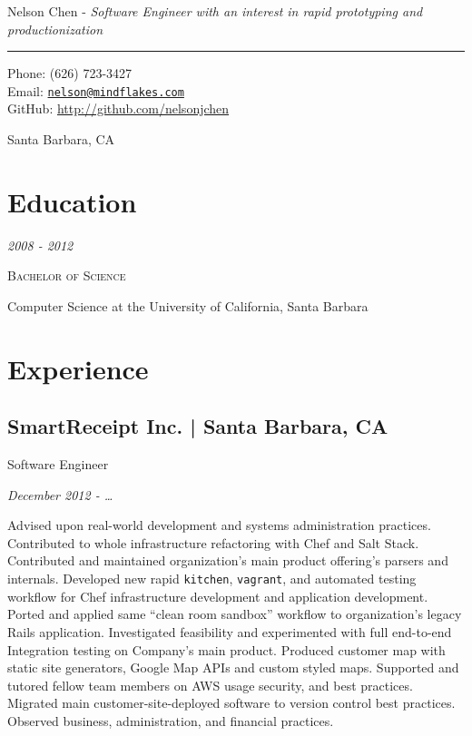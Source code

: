 \documentclass[10pt, letter]{article}
\makeatletter
\def\myname{Nelson Chen}
\def\myemail{nelson@mindflakes.com}
\def\mycellphone{(626) 723-3427}
\def\myaddress{Santa Barbara, CA}
\def\mygithub{nelsonjchen}
\newcommand{\years}[1]{\marginnote{#1}}
\renewcommand{\years}[1]{{\emph{#1}}}
\makeatother
\begin{document}
{\LARGE \myname} - \emph{Software Engineer with an interest in rapid prototyping and productionization}\\
\hrule
\begin{multicols}{2}
{Phone: \mycellphone}\\[.01cm]
{Email: \href{mailto:\myemail}{\texttt{\myemail}}}\\[.05cm]
{GitHub: \href{http://www.github.com/\mygithub}{http://github.com/\mygithub}}

\myaddress


\section*{Education}

\years{2008 - 2012}

\textsc{Bachelor of Science}

Computer Science at the University of California, Santa Barbara

\section*{Experience}

\subsection*{SmartReceipt Inc. | {\footnotesize{Santa Barbara, CA}}}

Software Engineer

\years{December 2012 - \ldots}

Advised upon real-world development and systems administration practices.
Contributed to whole infrastructure refactoring with Chef and Salt Stack.
Contributed and maintained organization's main product offering's parsers and
internals. Developed new rapid \texttt{kitchen}, \texttt{vagrant}, and
automated testing workflow for Chef infrastructure development and application
development. Ported and applied same ``clean room sandbox'' workflow to
organization's legacy Rails application. Investigated feasibility and
experimented with full end-to-end Integration testing on Company's main
product. Produced customer map with static site generators, Google Map APIs
and custom styled maps. Supported and tutored fellow team members on AWS usage
security, and best practices. Migrated main customer-site-deployed software to
version control best practices.  Observed business, administration, and
financial practices.


\end{multicols}
\end{document}
